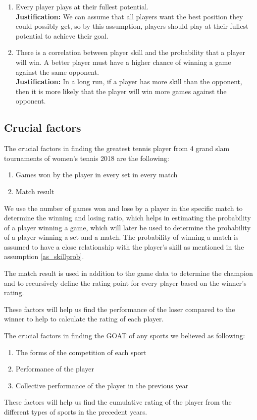 \begin{enumerate}
    \item Every player plays at their fullest potential. \label{as_fullpotential}
    \\ \textbf{Justification:} We can assume that all players want the best position they could possibly get, so by this assumption, players should play at their fullest potential to achieve their goal. %
    
    \item There is a correlation between player skill and the probability that a player will win. A better player must have a higher chance of winning a game against the same opponent.
    \label{as_skillprob}
    \\ \textbf{Justification:} In a long run, if a player has more skill than the opponent, then it is more likely that the player will win more games against the opponent. %
    
\end{enumerate}

\subsection{Crucial factors}

The crucial factors in finding the greatest tennis player from 4 grand slam tournaments of women's tennis 2018 are the following:
\begin{enumerate}
    \item Games won by the player in every set in every match
    \item Match result
\end{enumerate} %

We use the number of games won and lose by a player in the specific match to determine the winning and losing ratio, which helps in estimating the probability of a player winning a game, which will later be used to determine the probability of a player winning a set and a match. The probability of winning a match is assumed to have a close relationship with the player's skill as mentioned in the assumption \ref{as_skillprob}. %

The match result is used in addition to the game data to determine the champion and to recursively define the rating point for every player based on the winner's rating. %

These factors will help us find the performance of the loser compared to the winner to help to calculate the rating of each player.\newline %
\newpage

\noindent 
The crucial factors in finding the GOAT of any sports we believed as following:
\begin{enumerate}
    \item The forms of the competition of each sport
    \item Performance of the player 
    \item Collective performance of the player in the previous year
\end{enumerate}
These factors will help us find the cumulative rating of the player from the different types of sports in the precedent years. %